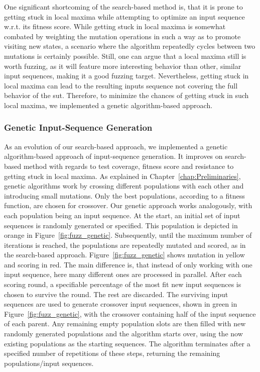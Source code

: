 One significant shortcoming of the search-based method is, that it is prone to getting stuck in local maxima while attempting to optimize an input sequence w.r.t. its fitness score. While getting stuck in local maxima is somewhat combated by weighting the mutation operations in such a way as to promote visiting new states, a scenario where the algorithm repeatedly cycles between two mutations is certainly possible. Still, one can argue that a local maxima still is worth fuzzing, as it will feature more interesting behavior than other, similar input sequences, making it a good fuzzing target. Nevertheless, getting stuck in local maxima can lead to the resulting inputs sequence not covering the full behavior of the \ac{sut}. Therefore, to minimize the chances of getting stuck in such local maxima, we implemented a genetic algorithm-based approach.

\subsubsection{Genetic Input-Sequence Generation} \label{subsubsec:genetic}
As an evolution of our search-based approach, we implemented a genetic algorithm-based approach of input-sequence generation. It improves on search-based method with regards to test coverage, fitness score and resistance to getting stuck in local maxima. As explained in Chapter~\ref{chap:Preliminaries}, genetic algorithms work by crossing different populations with each other and introducing small mutations. Only the best populations, according to a fitness function, are chosen for crossover. Our genetic approach works analogously, with each population being an input sequence. At the start, an initial set of input sequences is randomly generated or specified. This population is depicted in orange in Figure~\ref{fig:fuzz_genetic}. Subsequently, until the maximum number of iterations is reached, the populations are repeatedly mutated and scored, as in the search-based approach. Figure~\ref{fig:fuzz_genetic} shows mutation in yellow and scoring in red. The main difference is, that instead of only working with one input sequence, here many different ones are processed in parallel. After each scoring round, a specifiable percentage of the most fit new input sequences is chosen to survive the round. The rest are discarded. The surviving input sequences are used to generate crossover input sequences, shown in green in Figure~\ref{fig:fuzz_genetic}, with the crossover containing half of the input sequence of each parent. Any remaining empty population slots are then filled with new randomly generated populations and the algorithm starts over, using the now existing populations as the starting sequences. The algorithm terminates after a specified number of repetitions of these steps, returning the remaining populations/input sequences.

